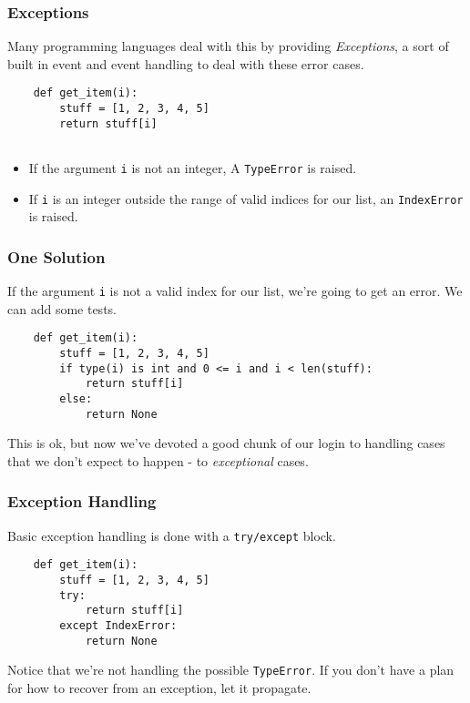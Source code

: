 \documentclass[10pt]{beamer}
\begin{document}
\begin{frame}[fragile]
  \frametitle{Exceptions}
  
  Many programming languages deal with this by providing \emph{Exceptions}, a 
  sort of built in event and event handling to deal with these error cases.    
  \vspace{5mm}
  \begin{verbatim}
    def get_item(i):
        stuff = [1, 2, 3, 4, 5]
        return stuff[i]
          
  \end{verbatim}
  
  \vspace{5mm}
  \begin{itemize}
    \item If the argument \texttt{i} is not an integer, A \texttt{TypeError} is raised.
    \item If \texttt{i} is an integer outside the range of valid indices for our list, an \texttt{IndexError} 
    is raised.
  \end{itemize}  
   
\end{frame}

\begin{frame}[fragile]
  \frametitle{One Solution}
  
  If the argument \texttt{i} is not a valid index for our list, we're
  going to get an error. We can add some tests.
    
  \vspace{5mm}
  \begin{verbatim}
    def get_item(i):
        stuff = [1, 2, 3, 4, 5]
        if type(i) is int and 0 <= i and i < len(stuff):
            return stuff[i]
        else:
            return None    
  \end{verbatim}
  
  \vspace{5mm}
  This is ok, but now we've devoted a good chunk of our login to handling 
  cases that we don't expect to happen - to \emph{exceptional} cases.
\end{frame}

\begin{frame}[fragile]
  \frametitle{Exception Handling}
  
  Basic exception handling is done with a \texttt{try/except} block.
  
  \vspace{5mm}
  \begin{verbatim}
    def get_item(i):
        stuff = [1, 2, 3, 4, 5]
        try:
            return stuff[i]
        except IndexError:
            return None    
  \end{verbatim}
  
  \vspace{5mm}
  Notice that we're not handling the possible \texttt{TypeError}. If you don't have a 
  plan for how to recover from an exception, let it propagate.
   
\end{frame}
\end{document}

